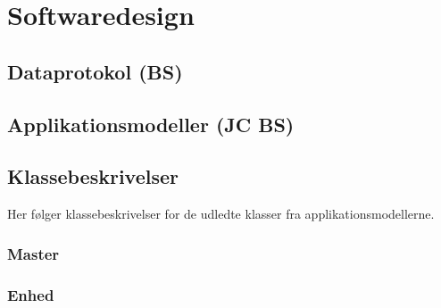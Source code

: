 \chapter{Softwaredesign}

\section{Dataprotokol (BS)}


\section{Applikationsmodeller (JC BS)}


\section{Klassebeskrivelser}
Her følger klassebeskrivelser for de udledte klasser fra applikationsmodellerne.

\subsection{Master}






\subsection{Enhed}







